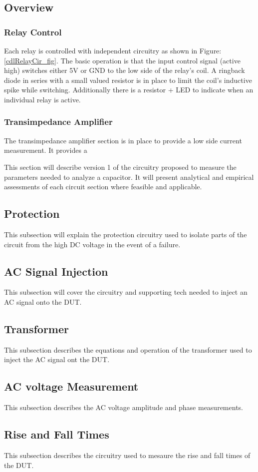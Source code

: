 
\subsection {Overview}

\subsubsection{Relay Control}

Each relay is controlled with independent circuitry as shown in Figure: \ref{cdlRelayCir_fig}. The basic operation is that the input control signal (active high) switches either 5V or GND to the low side of the relay's coil. A ringback diode in series with a small valued resistor is in place to limit the coil's inductive spike while switching. Additionally there is a resistor + LED to indicate when an individual relay is active.

\subsubsection{Transimpedance Amplifier}
The transimpedance amplifier section is in place to provide a low side current measurement. It provides a 

This section will describe version 1 of the circuitry proposed to measure the parameters needed to analyze a capacitor. It will present analytical and empirical assessments of each circuit section where feasible and applicable.

\subsection {Protection}

This subsection will explain the protection circuitry used to isolate parts of the circuit from the high DC voltage in the event of a failure.

\subsection {AC Signal Injection}

This subsection will cover the circuitry and supporting tech needed to inject an AC signal onto the DUT.

\subsection {Transformer}

This subsection describes the equations and operation of the transformer used to inject the AC signal ont the DUT.

\subsection {AC voltage Measurement}

This subsection describes the AC voltage amplitude and phase measurements. 

\subsection {Rise and Fall Times}

This subsection describes the circuitry used to mesaure the rise and fall times of the DUT.



